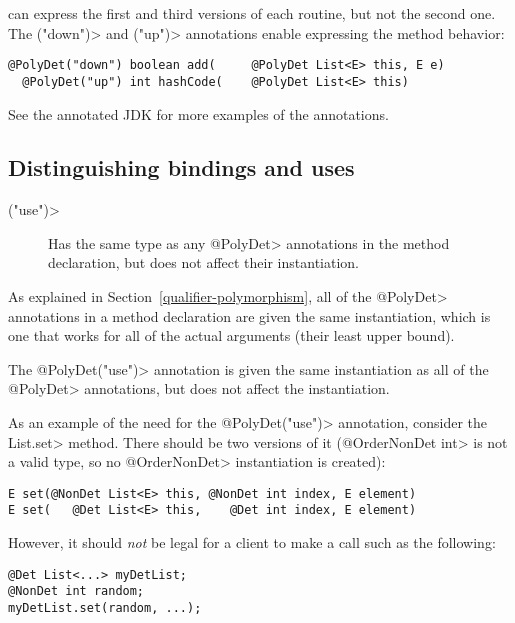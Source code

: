 \noindent
can express the first and third versions of each routine, but not the
second one.  The \<("down")> and
\<("up")> annotations enable
expressing the method behavior:

\begin{Verbatim}
@PolyDet("down") boolean add(     @PolyDet List<E> this, E e)
  @PolyDet("up") int hashCode(    @PolyDet List<E> this)
\end{Verbatim}

See the annotated JDK for more examples of the annotations.


\subsection{Distinguishing bindings and uses\label{determinism-polymorphism-binding}}

\begin{description}
\item[\<("use")>]
  Has the same type as any \<@PolyDet> annotations in the method
  declaration, but does not affect their instantiation.
\end{description}

As explained in Section~\ref{qualifier-polymorphism},
all of the \<@PolyDet> annotations in a method declaration are given the same
instantiation, which is one that works for all of the actual arguments
(their least upper bound).

The \<@PolyDet("use")> annotation is given the same instantiation as all of the
\<@PolyDet> annotations, but does not affect the instantiation.

As an example of the need for the \<@PolyDet("use")> annotation, consider the
\<List.set> method.  There should be two versions of it (\<@OrderNonDet
int> is not a valid type, so no \<@OrderNonDet> instantiation is created):

\begin{Verbatim}
E set(@NonDet List<E> this, @NonDet int index, E element)
E set(   @Det List<E> this,    @Det int index, E element)
\end{Verbatim}

\noindent
However, it should \emph{not} be legal for a client to make a call such as
the following:

\begin{Verbatim}
@Det List<...> myDetList;
@NonDet int random;
myDetList.set(random, ...);
\end{Verbatim}

